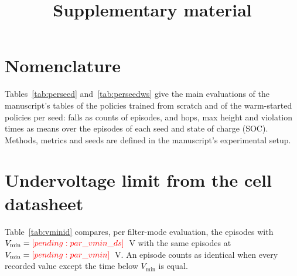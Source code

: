 \documentclass[12pt,a4paper]{article}
\title{Supplementary material\\[4pt]\large \papertitle}
\date{}
\begin{document}
\maketitle
\section*{Nomenclature}

\clearpage
Tables~\ref{tab:perseed} and~\ref{tab:perseedws} give the main evaluations of the manuscript's tables of the policies trained from scratch and of the warm-started policies per seed: falls as counts of episodes, and hops, max height and violation times as means over the  episodes of each seed and state of charge (SOC). Methods, metrics and seeds are defined in the manuscript's experimental setup.
\begin{table}[p]\centering\caption{Policies trained from scratch, per seed.}\label{tab:perseed}
\end{table}
\begin{table}[p]\centering\caption{Policies trained from scratch, per seed (continued from Table~\ref{tab:perseed}).}
\end{table}
\begin{table}[p]\centering\caption{Warm-started policies, per seed.}\label{tab:perseedws}
\end{table}
\begin{table}[p]\centering\caption{Warm-started policies, per seed (continued from Table~\ref{tab:perseedws}).}
\end{table}
\begin{table}[p]\centering\caption{Warm-started policies, per seed (continued from Table~\ref{tab:perseedws}).}
\end{table}
\section*{Undervoltage limit from the cell datasheet}
Table~\ref{tab:vminid} compares, per filter-mode evaluation, the episodes with $V_{\min}=\res{par_vmin_ds}$~V with the same episodes at $V_{\min}=\res{par_vmin}$~V. An episode counts as identical when every recorded value except the time below $V_{\min}$ is equal.
\begin{table}[p]\centering\caption{$V_{\min}=\res{par_vmin_ds}$~V against $V_{\min}=\res{par_vmin}$~V, warm-started policies in filter mode,  episodes per state of charge and seed: episodes identical in every recorded value except the time below $V_{\min}$, and the largest difference in max height over the episodes.}\label{tab:vminid}
\end{table}
\end{document}
